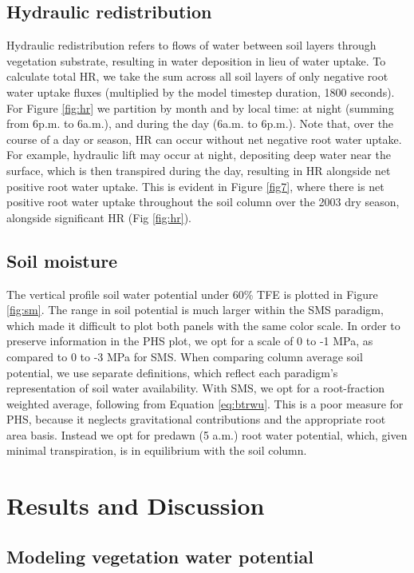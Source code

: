 \documentclass[draft,linenumbers]{agujournal}
\begin{document}
        
\subsection{Hydraulic redistribution}
    Hydraulic redistribution refers to flows of water between soil layers through vegetation substrate, resulting in water deposition in lieu of water uptake.
    To calculate total HR, we take the sum across all soil layers of only negative root water uptake fluxes (multiplied by the model timestep duration, 1800 seconds).
    For Figure \ref{fig:hr} we partition by month and by local time: at night (summing from 6p.m. to 6a.m.), and during the day (6a.m. to 6p.m.).
    Note that, over the course of a day or season, HR can occur without net negative root water uptake.
    For example, hydraulic lift may occur at night, depositing deep water near the surface, which is then transpired during the day,
    resulting in HR alongside net positive root water uptake.
    This is evident in Figure \ref{fig7}, where there is net positive root water uptake throughout the soil column over the 2003 dry season, alongside significant HR (Fig \ref{fig:hr}).

\subsection{Soil moisture}
    The vertical profile soil water potential under 60\% TFE is plotted in Figure \ref{fig:sm}.
    The range in soil potential is much larger within the SMS paradigm, which made it difficult to plot both panels with the same color scale.
    In order to preserve information in the PHS plot, we opt for a scale of 0 to -1 MPa, as compared to 0 to -3 MPa for SMS.
    When comparing column average soil potential, we use separate definitions, which reflect each paradigm's representation of soil water availability.
    With SMS, we opt for a root-fraction weighted average, following from Equation \ref{eq:btrwu}.
    This is a poor measure for PHS, because it neglects gravitational contributions and the appropriate root area basis. 
    Instead we opt for predawn (5 a.m.) root water potential, which, given minimal transpiration, is in equilibrium with the soil column. 
    
\section{Results and Discussion}
\subsection{Modeling vegetation water potential}
    
\end{document}

